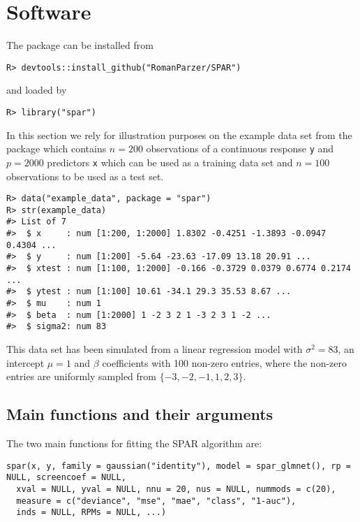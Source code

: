\documentclass[
  article]{jss}
\begin{document}
\section{Software}\label{sec-software}

The package can be installed from 

\begin{verbatim}
R> devtools::install_github("RomanParzer/SPAR")
\end{verbatim}

and loaded by

\begin{verbatim}
R> library("spar")
\end{verbatim}

In this section we rely for illustration purposes on the example data
set from the package which contains \(n=200\) observations of a
continuous response \texttt{y} and \(p=2000\) predictors \texttt{x}
which can be used as a training data set and \(n=100\) observations to
be used as a test set.

\begin{verbatim}
R> data("example_data", package = "spar")
R> str(example_data)
#> List of 7
#>  $ x     : num [1:200, 1:2000] 1.8302 -0.4251 -1.3893 -0.0947 0.4304 ...
#>  $ y     : num [1:200] -5.64 -23.63 -17.09 13.18 20.91 ...
#>  $ xtest : num [1:100, 1:2000] -0.166 -0.3729 0.0379 0.6774 0.2174 ...
#>  $ ytest : num [1:100] 10.61 -34.1 29.3 35.53 8.67 ...
#>  $ mu    : num 1
#>  $ beta  : num [1:2000] 1 -2 3 2 1 -3 2 3 1 -2 ...
#>  $ sigma2: num 83
\end{verbatim}

This data set has been simulated from a linear regression model with
\(\sigma^2=83\), an intercept \(\mu=1\) and \(\beta\) coefficients with
100 non-zero entries, where the non-zero entries are uniformly sampled
from \(\{-3,-2,-1,1,2,3\}\).

\subsection{Main functions and their
arguments}\label{main-functions-and-their-arguments}

The two main functions for fitting the SPAR algorithm are:

\begin{verbatim}
spar(x, y, family = gaussian("identity"), model = spar_glmnet(), rp = NULL, screencoef = NULL,
  xval = NULL, yval = NULL, nnu = 20, nus = NULL, nummods = c(20),
  measure = c("deviance", "mse", "mae", "class", "1-auc"),
  inds = NULL, RPMs = NULL, ...)
\end{verbatim}
\end{document}
